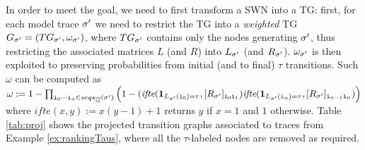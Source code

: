 In order to meet the goal, we need to first transform a SWN into a TG: first, for each model trace $\nonlogtrace$ we need to restrict the TG into a \textit{weighted} TG $G_\nonlogtrace=(TG_{\nonlogtrace},\omega_\nonlogtrace)$, where $TG_{\nonlogtrace}$ contains only the nodes generating $\nonlogtrace$, thus restricting the associated matrices $L$ (and $R$) into $L_\nonlogtrace$ (and $R_\nonlogtrace$). $\omega_\nonlogtrace$ is then exploited to preserving probabilities from initial (and to final) $\tau$ transitions. Such $\omega$ can be computed as $\omega := 1-\prod_{\Ind{0}\cdots\Ind{n}\in\seqs{\sigma'}{ \closed{G}}}\Big(1-(\textit{ifte}(\mathbf{1}_{L_{\sigma'}(\Ind{0})=\tau},[R_{\sigma'}]_{\Ind{0}\Ind{1}})\textit{ifte}(\mathbf{1}_{L_{\sigma'}(\Ind{n})=\tau},[R_{\sigma'}]_{\Ind{n-1}\Ind{n}})\Big)$
where $\textit{ifte}(x,y):=x(y-1)+1$ returns $y$ if $x=1$ and $1$ otherwise. %
Table \ref{tab:proj} shows the projected transition graphs associated to  traces from Example \ref{ex:rankingTaus}, where  all the $\tau$-labeled nodes are removed as required.
%	
%
%
